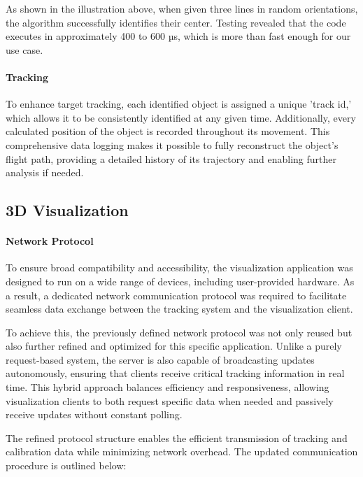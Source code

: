 As shown in the illustration above, when given three lines in random orientations, the algorithm successfully identifies their center. Testing revealed that the code executes in approximately 400 to 600 µs, which is more than fast enough for our use case.

\paragraph{Tracking}
To enhance target tracking, each identified object is assigned a unique 'track \acrshort{id},' which allows it to be consistently identified at any given time. Additionally, every calculated position of the object is recorded throughout its movement. This comprehensive data logging makes it possible to fully reconstruct the object's flight path, providing a detailed history of its trajectory and enabling further analysis if needed.


\subsection{3D Visualization}
\paragraph{Network Protocol}  
To ensure broad compatibility and accessibility, the visualization application was designed to run on a wide range of devices, including user-provided hardware. As a result, a dedicated network communication protocol was required to facilitate seamless data exchange between the tracking system and the visualization client.  

To achieve this, the previously defined network protocol was not only reused but also further refined and optimized for this specific application. Unlike a purely request-based system, the server is also capable of broadcasting updates autonomously, ensuring that clients receive critical tracking information in real time. This hybrid approach balances efficiency and responsiveness, allowing visualization clients to both request specific data when needed and passively receive updates without constant polling.  

The refined protocol structure enables the efficient transmission of tracking and calibration data while minimizing network overhead. The updated communication procedure is outlined below:  

